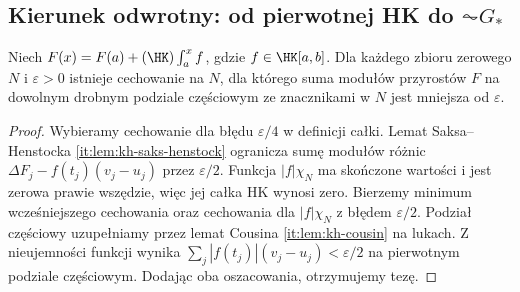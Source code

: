\subsection{Kierunek odwrotny: od pierwotnej HK do $\AC G_*$}
\begin{lemat}
\label{ma1:kh:lem:kh-null-variation}\label{it:lem:kh-null-variation}
Niech $F(x)=F(a)+(\HK)\int_a^x f$, gdzie $f\in\HK[a,b]$. Dla każdego zbioru zerowego $N$ i $\varepsilon>0$ istnieje cechowanie na $N$, dla którego suma modułów przyrostów $F$ na dowolnym drobnym podziale częściowym ze znacznikami w $N$ jest mniejsza od $\varepsilon$.
\end{lemat}
\begin{proof}
Wybieramy cechowanie dla błędu $\varepsilon/4$ w definicji całki. Lemat Saksa--Henstocka \ref{it:lem:kh-saks-henstock} ogranicza sumę modułów różnic $\Delta F_j-f(t_j)(v_j-u_j)$ przez $\varepsilon/2$. Funkcja $|f|\chi_N$ ma skończone wartości i jest zerowa prawie wszędzie, więc jej całka HK wynosi zero. Bierzemy minimum wcześniejszego cechowania oraz cechowania dla $|f|\chi_N$ z błędem $\varepsilon/2$. Podział częściowy uzupełniamy przez lemat Cousina \ref{it:lem:kh-cousin} na lukach. Z nieujemności funkcji wynika $\sum_j |f(t_j)|(v_j-u_j)<\varepsilon/2$ na pierwotnym podziale częściowym. Dodając oba oszacowania, otrzymujemy tezę.
\end{proof}

